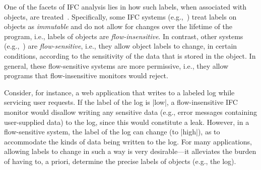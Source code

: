 One of the facets of IFC analysis lies in how such labels, when associated with
objects, are treated~\cite{Hunt:2006}.
%
Specifically, some IFC systems (e.g.,~\cite{Breeze, Aeolus, stefan:lio,
stefan:addressing-covert, zeldovich:histar, Efstathopoulos:2005, krohn:flume})
treat labels on objects as \emph{immutable} and do not allow for changes over
the lifetime of the program, i.e., labels of objects are \emph{flow-insensitive}.
%
In contrast, other systems (e.g.,~\cite{Zdancewic02programminglanguages, Austin:Flanagan:PLAS09,
Austin:Flanagan:PLAS10}) are \emph{flow-sensitive}, i.e., they allow object
labels to change, in certain conditions, according to the sensitivity of the
data that is stored in the object.
%
In general, these flow-sensitive systems are more permissive, i.e., they allow
programs that flow-insensitive monitors would reject.
 
Consider, for instance, a web application that writes to a labeled
log while servicing user requests.
%
If the label of the log is |low|, a flow-insensitive IFC monitor would disallow
writing any sensitive data (e.g., error messages containing user-supplied data)
to the log, since this would constitute a leak.
%
However, in a flow-sensitive system, the label of the log can change (to
|high|), as to accommodate the kinds of data being written to the log.
%
For many applications, allowing labels to change in such a way is very
desirable---it alleviates the burden of having to, a priori, determine the
precise labels of objects (e.g., the log).

